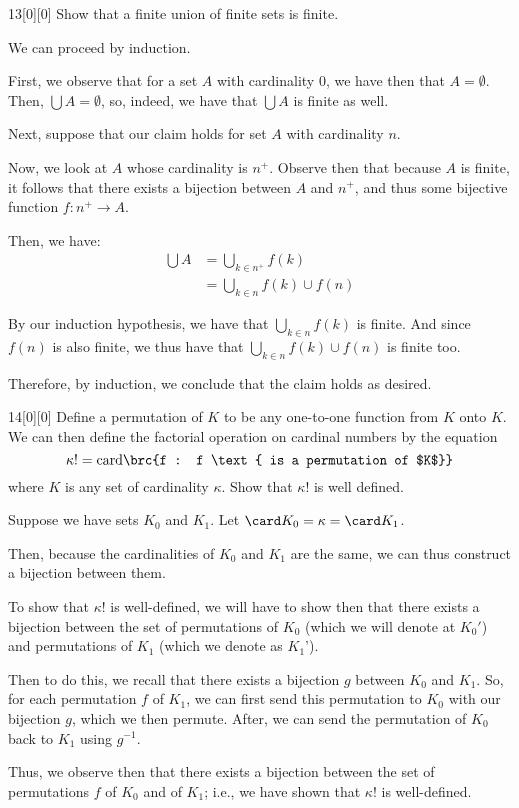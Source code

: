 \documentclass{article}
\begin{document}
\begin{hw}{13}[0][0]
	Show that a finite union of finite sets is finite.
\end{hw}
\begin{solution}
	We can proceed by induction.
	
	First, we observe that for a set $A$ with cardinality $0$, we have then that $A = \emptyset$. Then, $\bigcup A = \emptyset$, so, indeed, we have that $\bigcup A$ is finite as well.
	
	Next, suppose that our claim holds for set $A$ with cardinality $n$.
	
	Now, we look at $A$ whose cardinality is $n^{+}$. Observe then that because $A$ is finite, it follows that there exists a bijection between $A$ and $n^{+}$, and thus some bijective function $f : n^{+} \rightarrow A$.
	
	Then, we have:
	\begin{align*}
		\bigcup A &= \bigcup_{k \in n^{+}} f(k) \\
		&= \bigcup_{k \in n} f(k) \cup f(n)
	\end{align*}

	By our induction hypothesis, we have that $\bigcup_{k \in n} f(k)$ is finite. And since $f(n)$ is also finite, we thus have that $\bigcup_{k \in n} f(k) \cup f(n)$ is finite too.
	
	Therefore, by induction, we conclude that the claim holds as desired.
\end{solution}

\begin{hw}{14}[0][0]
	Define a permutation of $K$ to be any one-to-one function from $K$
	onto $K$. We can then define the factorial operation on cardinal numbers by the equation
	\begin{equation*}
		\kappa ! = \mathrm{card} \brc{f : f \text{ is a permutation of $K$}}
	\end{equation*}
	where $K$ is any set of cardinality $\kappa$. Show that $\kappa !$ is well defined.
\end{hw}
\begin{solution}
	Suppose we have sets $K_0$ and $K_1$. Let $\card K_0 = \kappa = \card K_1$. 
	
	Then, because the cardinalities of $K_0$ and $K_1$ are the same, we can thus construct a bijection between them.
	
	To show that $\kappa!$ is well-defined, we will have to show then that there exists a bijection between the set of permutations of $K_0$ (which we will denote at $K_0'$) and permutations of $K_1$ (which we denote as $K_1$').
	
	Then to do this, we recall that there exists a bijection $g$ between $K_0$ and $K_1$. So, for each permutation $f$ of $K_1$, we can first send this permutation to $K_0$ with our bijection $g$, which we then permute. After, we can send the permutation of $K_0$ back to $K_1$ using $g^{-1}$.
	
	Thus, we observe then that there exists a bijection between the set of permutations $f$ of $K_0$ and of $K_1$; i.e., we have shown that $\kappa!$ is well-defined.
\end{solution}
\end{document}
